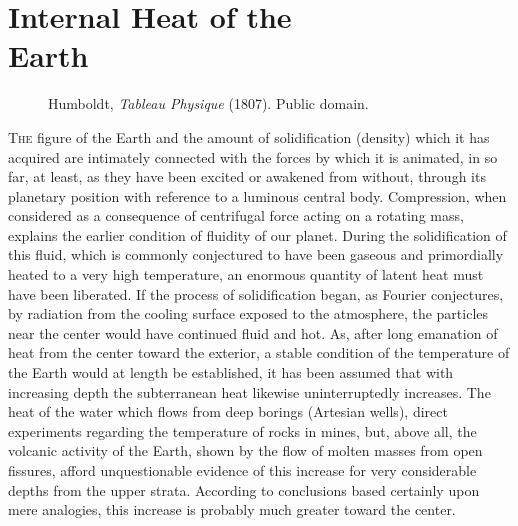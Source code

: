 
\chapter[Internal Heat of ...]{Internal Heat of the \\Earth}

\begin{figure}[ht]
    \vspace{-40pt}
        \caption{\footnotesize Humboldt, \emph{Tableau Physique} (1807). Public domain.}
\end{figure}

\lettrine[lines=4]{\goudy T}{he} figure of the Earth and the amount of solidification (density) which it has acquired are intimately connected with the forces by which it is animated, in so far, at least, as they have been excited or awakened from without, through its planetary position with reference to a luminous central body. Compression, when considered as a consequence of centrifugal force acting on a rotating mass, explains the earlier condition of fluidity of our planet. During the solidification of this fluid, which is commonly conjectured to have been gaseous and primordially heated to a very high temperature, an enormous quantity of latent heat must have been liberated. If the process of solidification began, as Fourier conjectures, by radiation from the cooling surface exposed to the atmosphere, the particles near the center would have continued fluid and hot. As, after long emanation of heat from the center toward the exterior, a stable condition of the temperature of the Earth would at length be established, it has been assumed that with increasing depth the subterranean heat likewise uninterruptedly increases. The heat of the water which flows from deep borings (Artesian wells), direct experiments regarding the temperature of rocks in mines, but, above all, the volcanic activity of the Earth, shown by the flow of molten masses from open fissures, afford unquestionable evidence of this increase for very considerable depths from the upper strata. According to conclusions based certainly upon mere analogies, this increase is probably much greater toward the center.


